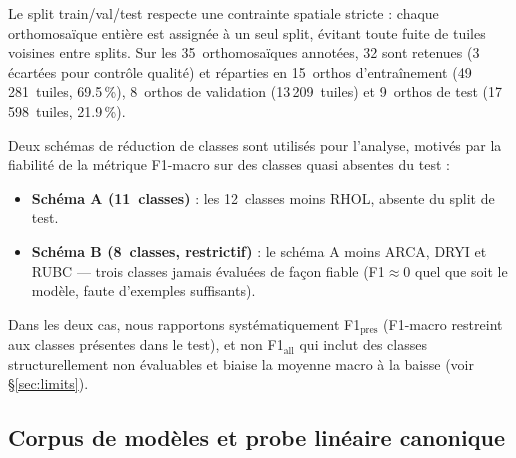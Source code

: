 \documentclass[11pt,a4paper]{article}
\newcommand{\fmpres}{F1$_{\text{pres}}$}
\newcommand{\fmall}{F1$_{\text{all}}$}
\begin{document}
Le split train/val/test respecte une contrainte spatiale stricte : chaque orthomosaïque entière est assignée à un seul split, évitant toute fuite de tuiles voisines entre splits. Sur les 35~orthomosaïques annotées, 32 sont retenues (3 écartées pour contrôle qualité) et réparties en 15~orthos d'entraînement (49\,281~tuiles, 69.5\,\%), 8~orthos de validation (13\,209~tuiles) et 9~orthos de test (17\,598~tuiles, 21.9\,\%).

Deux schémas de réduction de classes sont utilisés pour l'analyse, motivés par la fiabilité de la métrique F1-macro sur des classes quasi absentes du test :
\begin{itemize}
	\item \textbf{Schéma A (11~classes)} : les 12~classes moins RHOL, absente du split de test.
	\item \textbf{Schéma B (8~classes, restrictif)} : le schéma A moins ARCA, DRYI et RUBC — trois classes jamais évaluées de façon fiable (F1$\approx$0 quel que soit le modèle, faute d'exemples suffisants).
\end{itemize}
Dans les deux cas, nous rapportons systématiquement \fmpres{} (F1-macro restreint aux classes présentes dans le test), et non \fmall{} qui inclut des classes structurellement non évaluables et biaise la moyenne macro à la baisse (voir \S\ref{sec:limits}).

\subsection{Corpus de modèles et probe linéaire canonique}
\end{document}

